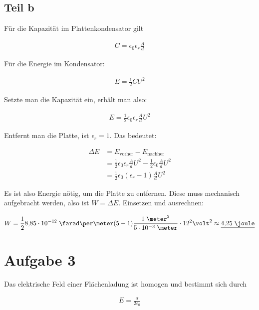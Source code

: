 \documentclass[a4paper,german,12pt,smallheadings]{scrartcl}
\begin{document}
\subsection*{Teil b}

Für die Kapazität im Plattenkondensator gilt

\begin{align*}
  C = \epsilon_0 \epsilon_r \frac{A}{d}
\end{align*}

Für die Energie im Kondensator:

\begin{align*}
  E = \frac{1}{2} C U^2
\end{align*}


Setzte man die Kapazität ein, erhält man also:

\begin{align*}
  E = \frac{1}{2} \epsilon_0 \epsilon_r \frac{A}{d}  U^2
\end{align*}

Entfernt man die Platte, ist $\epsilon_r = 1$. Das bedeutet:

\begin{align*}
  \Delta E &= E_\text{vorher} - E_\text{nachher}  \\ 
           &= \frac{1}{2} \epsilon_0 \epsilon_r \frac{A}{d}  U^2 - \frac{1}{2} \epsilon_0 \frac{A}{d}  U^2 \\
           &= \frac{1}{2} \epsilon_0 (\epsilon_r - 1) \frac{A}{d}  U^2
\end{align*}

Es ist also Energie nötig, um die Platte zu entfernen. Diese muss mechanisch
aufgebracht werden, also ist $W = \Delta E$. Einsetzen und ausrechnen:

\begin{align*}
  W = \frac{1}{2} 8{,}85 \cdot 10^{-12} \;\farad\per\meter (5-1) \frac{1\;\meter^2}{5\cdot 10^{-3}\;\meter} \cdot 12^2 \volt^2 \approx \underline{4{,}25\;\joule}
\end{align*}

\section*{Aufgabe 3}

Das elektrische Feld einer Flächenladung ist homogen und bestimmt sich durch

\begin{align*}
  E = \frac{\sigma}{2 \epsilon_0} \\
\end{align*}
\end{document}

